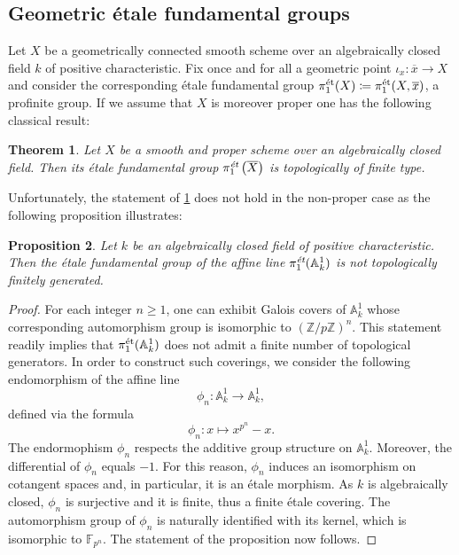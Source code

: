 \documentclass[10pt,a4paper]{amsart}
\numberwithin{equation}{subsection}
\theoremstyle{plain}
\newtheorem{theorem}{Theorem}[section]
\newtheorem{prop}[theorem]{Proposition}
\theoremstyle{definition}
\theoremstyle{remark}
\numberwithin{equation}{section}
\begin{document}
\subsection{Geometric \'etale fundamental groups}
Let $X$ be a geometrically connected smooth scheme over an algebraically closed field $k$ of positive
characteristic.
Fix once and for all a geometric point $\iota_x \colon \overline{x} \to X$ and consider the corresponding \'etale fundamental group $\pi_1^{\text{\'et}}(X) \coloneqq \pi_1^{\text{\'et}}(X, \overline{x})$, a profinite group. If we assume that $X$ is moreover proper one has the following
classical result:

\begin{theorem}{\cite[Expos\'e 10, Thm 2.9]{grothendieckSGA1}} \label{proper_case}
Let $X$ be a smooth and proper scheme over an algebraically closed field.
Then its \'etale fundamental group $\pi^\emph{\text{\'et}}_1 \left( \overline{X} \right)$ is topologically of finite type.
\end{theorem}

Unfortunately, the statement of \cref{proper_case} does not hold in the non-proper case as the following proposition illustrates:

\begin{prop}
Let $k$ be an algebraically closed field of positive characteristic. Then the \'etale fundamental group of the affine line $\pi_1^\emph{\text{\'et}}(\mathbb A^1_k)$ is not topologically finitely generated.
\end{prop}

\begin{proof}
For each integer $n \geq 1$, one can exhibit Galois covers of $\mathbb A^1_k$ whose corresponding automorphism group is isomorphic to $\left( \mathbb Z / p \mathbb Z \right)^n$. This statement readily
implies that $\pi_1^{\text{\'et}}(\mathbb A^1_k)$ does not admit a finite
number of
topological generators. In order to construct such coverings, we consider the following endomorphism of the affine line
	\[
		\phi_n \colon \mathbb A^1_k \to \mathbb A^1_k,
	\]
defined via the formula
	\[
		\phi_n \colon x \mapsto x^{p^n} - x.
	\] 
The endormophism $\phi_n$ respects the additive group structure on $\mathbb A^1_k$. Moreover,
the differential of $\phi_n$ equals $-1$. For this reason, $\phi_n$ induces an isomorphism on cotangent spaces and, in particular, it is an \'etale morphism.
As $k$ is algebraically closed, $\phi_n$ is surjective and it is finite, thus a finite \'etale covering. The automorphism group
of
$\phi_n$ is naturally
identified with its kernel, which is isomorphic to $\mathbb F_{p^n}$. The statement of the proposition now follows.
\end{proof}
\end{document}

